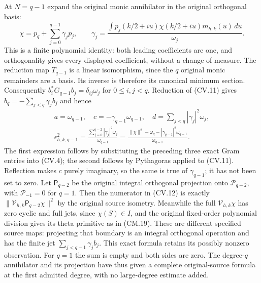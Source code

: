 At $N=q-1$ expand the original monic annihilator in the original
orthogonal basis:
\[
 \chi=p_q+\sum_{j=0}^{q-1}\gamma_jp_j,\qquad
 \gamma_j=\frac{\int\overline{p_j(k/2+iu)}\chi(k/2+iu)m_{h,k}(u)\,du}{\omega_j}.
 \tag{CV.11}
\]
This is a finite polynomial identity: both leading coefficients are one,
and orthogonality gives every displayed coefficient, without a change of
measure. The reduction map $T_{q-1}$ is a linear isomorphism, since the
$q$ original monic remainders are a basis. Its inverse is therefore its
canonical minimum section. Consequently
$b_i^*G_{q-1}b_j=\delta_{ij}\omega_j$ for $0\le i,j<q$.
Reduction of (CV.11) gives $b_q=-\sum_{j<q}\gamma_jb_j$ and hence
\[
 \begin{gathered}
 a=\omega_{q-1},\quad
 c=-\gamma_{q-1}\omega_{q-1},\quad
 d=\sum_{j<q}|\gamma_j|^2\omega_j,\\
 \boxed{\epsilon_{h,k,q-1}^2
 =\frac{\sum_{j=0}^{q-2}|\gamma_j|^2\omega_j}{\omega_{q-1}}
 =\frac{\|\chi\|^2-\omega_q-|\gamma_{q-1}|^2\omega_{q-1}}{\omega_{q-1}}.}
\end{gathered}
 \tag{CV.12}
\]
The first expression follows by substituting the preceding three exact
Gram entries into (CV.4); the second follows by Pythagoras applied to
(CV.11). Reflection makes $c$ purely imaginary, so the same is true of
$\gamma_{q-1}$; it has not been set to zero. Let $\mathsf P_{q-2}$
be the original integral orthogonal projection onto
$\mathcal P_{q-2}$, with $\mathcal P_{-1}=0$ for $q=1$.
Then the numerator in (CV.12) is exactly
$\|\mathcal V_{h,k}\mathsf P_{q-2}\chi\|^2$ by the original
source isometry. Meanwhile the full $\mathcal V_{h,k}\chi$ has
zero cyclic and full jets, since $\chi(S)\in I$, and the original
fixed-order polynomial division gives its theta primitive as in
(CM.19). These are different specified source maps: projecting that
boundary is an integral orthogonal operation and has the finite
jet $\sum_{j<q-1}\gamma_jb_j$. This exact formula retains its
possibly nonzero observation. For $q=1$ the sum is empty and both
sides are zero. The degree-$q$ annihilator and its projection have
thus given a complete original-source formula at the first admitted
degree, with no large-degree estimate added.
